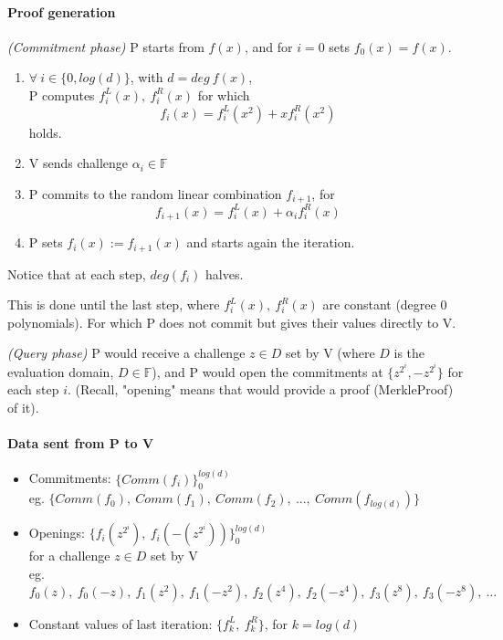 \documentclass{article}
\theoremstyle{definition}
\begin{document}
\vspace{30px}

\paragraph{Proof generation}

\emph{(Commitment phase)}
P starts from $f(x)$, and for $i=0$ sets $f_0(x)=f(x)$.
\begin{enumerate}
	\item $\forall~i \in \{0, log(d)\}$, with $d = deg~f(x)$,\\
		P computes $f_i^L(x),~ f_i^R(x)$ for which
		\begin{equation}\tag{eq. $A_i$}
			f_i(x) = f_i^L(x^2) + x f_i^R(x^2)
		\end{equation}
		holds.
	\item V sends challenge $\alpha_i \in \mathbb{F}$
	\item P commits to the random linear combination $f_{i+1}$, for
		\begin{equation}\tag{eq. $B_i$}
		f_{i+1}(x) = f_i^L(x) + \alpha_i f_i^R(x)
	\end{equation}
	\item P sets $f_i(x) := f_{i+1}(x)$ and starts again the iteration.
\end{enumerate}
Notice that at each step, $deg(f_i)$ halves.

This is done until the last step, where $f_i^L(x),~ f_i^R(x)$ are constant (degree 0 polynomials). For which P does not commit but gives their values directly to V.

\emph{(Query phase)}
P would receive a challenge $z \in D$ set by V (where $D$ is the evaluation domain, $D \in \mathbb{F}$), and P would open the commitments at $\{z^{2^i}, -z^{2^i}\}$ for each step $i$.
(Recall, "opening" means that would provide a proof (MerkleProof) of it).

\paragraph{Data sent from P to V}
\begin{itemize}
	\item[] Commitments: $\{Comm(f_i)\}_0^{log(d)}$\\
		{\scriptsize eg. $\{Comm(f_0),~ Comm(f_1),~ Comm(f_2),~ ...,~ Comm(f_{log(d)})\}$ }
	\item[] Openings: $\{ f_i(z^{2^i}),~f_i(-(z^{2^i})) \}_0^{log(d)}$\\
		for a challenge $z \in D$ set by V\\
		{\scriptsize eg. $f_0(z),~ f_0(-z),~ f_1(z^2),~ f_1(-z^2),~ f_2(z^4),~ f_2(-z^4),~ f_3(z^8),~ f_3(-z^8),~ \ldots$}
	\item[] Constant values of last iteration: $\{f_k^L,~f_k^R\}$, for $k=log(d)$
\end{itemize}
\end{document}

